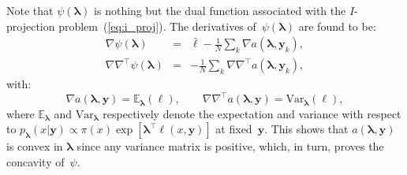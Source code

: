 \documentclass[english]{scrartcl}
\def\y{{\mathbf{y}}}
\newcommand{\blambda}{{\boldsymbol{\lambda}}}
\newcommand{\bell}{{\boldsymbol{\ell}}}
\newcommand{\E}{\mathbb{E}}
\begin{document}
Note that $\psi(\blambda)$ is nothing but the dual function associated with the $I$-projection problem~(\ref{eq:i_proj}). The derivatives of~$\psi(\blambda)$ are found to be:
\begin{eqnarray*}
\nabla\psi(\blambda)
 & = & \bar{\bell} - \frac{1}{N} \sum_k \nabla a(\blambda,\y_k), \\
\nabla\nabla^\top\psi(\blambda)
 & = & - \frac{1}{N} \sum_k \nabla \nabla^\top a(\blambda,\y_k),
\end{eqnarray*}
with:
$$
\nabla a(\blambda,\y) = \E_{\blambda}(\bell),
\qquad
\nabla \nabla^\top a(\blambda,\y) = \text{Var}_{\blambda}(\bell),
$$
where $\E_{\blambda}$ and $\text{Var}_{\blambda}$ respectively denote the expectation and variance with respect to $p_\blambda(x|\y)\propto \pi(x)\exp[\blambda^\top \bell(x,\y)]$ at fixed~$\y$. This shows that $a(\blambda,\y)$ is convex in $\blambda$ since any variance matrix is positive, which, in turn, proves the concavity of~$\psi$.


%
%


\end{document}
